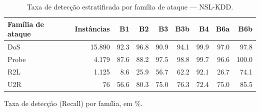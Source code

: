 \begin{table}[htbp]
\centering
\caption{Taxa de detecção estratificada por família de ataque — NSL-KDD.}
\label{tab:recall-estratificado-nsl-kdd}
\small
\begin{tabular}{lrrrrrrrr}
\hline
Família de ataque & Instâncias & B1 & B2 & B3 & B3b & B4 & B6a & B6b \\
\hline
DoS & 15.890 & 92.3 & 96.8 & 90.9 & 94.1 & 99.9 & 97.0 & 97.8 \\
Probe & 4.179 & 87.6 & 88.2 & 97.5 & 98.8 & 99.7 & 96.6 & 100.0 \\
R2L & 1.125 & 8.6 & 25.9 & 56.7 & 62.2 & 92.1 & 26.7 & 74.1 \\
U2R & 76 & 56.6 & 80.3 & 75.0 & 76.3 & 72.4 & 75.0 & 85.5 \\
\hline
\end{tabular}
\begin{flushleft}\footnotesize Taxa de detecção (Recall) por família, em \%. \end{flushleft}
\end{table}
